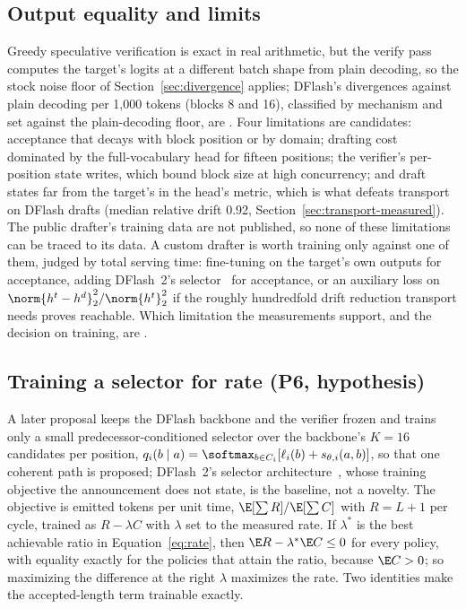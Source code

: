 \subsection{Output equality and limits}\label{sec:drafter-limits}
Greedy speculative verification is exact in real arithmetic, but the verify pass computes the target's logits at a different batch shape from plain decoding, so the stock noise floor of Section~\ref{sec:divergence} applies; DFlash's divergences against plain decoding per 1,000 tokens (blocks 8 and 16), classified by mechanism and set against the plain-decoding floor, are . Four limitations are candidates: acceptance that decays with block position or by domain; drafting cost dominated by the full-vocabulary head for fifteen positions; the verifier's per-position state writes, which bound block size at high concurrency; and draft states far from the target's in the head's metric, which is what defeats transport on DFlash drafts (median relative drift 0.92, Section~\ref{sec:transport-measured}). The public drafter's training data are not published, so none of these limitations can be traced to its data. A custom drafter is worth training only against one of them, judged by total serving time: fine-tuning on the target's own outputs for acceptance, adding DFlash~2's selector~\cite{dflash} for acceptance, or an auxiliary loss on $\norm{h^t-h^d}_2^2/\norm{h^t}_2^2$ if the roughly hundredfold drift reduction transport needs proves reachable. Which limitation the measurements support, and the decision on training, are .

\subsection{Training a selector for rate (P6, hypothesis)}\label{sec:drafter-selector}
A later proposal keeps the DFlash backbone and the verifier frozen and trains only a small predecessor-conditioned selector over the backbone's $K=16$ candidates per position, $q_i(b\mid a)=\softmax_{b\in C_i}[\ell_i(b)+s_{\theta,i}(a,b)]$, so that one coherent path is proposed; DFlash~2's selector architecture~\cite{dflash}, whose training objective the announcement does not state, is the baseline, not a novelty. The objective is emitted tokens per unit time, $\E[\sum R]/\E[\sum C]$ with $R=L+1$ per cycle, trained as $R-\lambda C$ with $\lambda$ set to the measured rate. If $\lambda^\ast$ is the best achievable ratio in Equation~\eqref{eq:rate}, then $\E R-\lambda^\ast\E C\le0$ for every policy, with equality exactly for the policies that attain the ratio, because $\E C>0$; so maximizing the difference at the right $\lambda$ maximizes the rate. Two identities make the accepted-length term trainable exactly.

